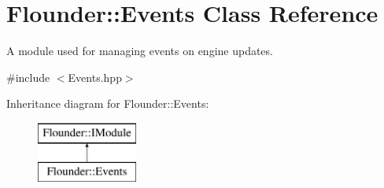 \hypertarget{class_flounder_1_1_events}{}\section{Flounder\+:\+:Events Class Reference}
\label{class_flounder_1_1_events}


A module used for managing events on engine updates.  




{\ttfamily \#include $<$Events.\+hpp$>$}

Inheritance diagram for Flounder\+:\+:Events\+:\begin{figure}[H]
\begin{center}
\leavevmode
\includegraphics[height=2.000000cm]{class_flounder_1_1_events}
\end{center}
\end{figure}
